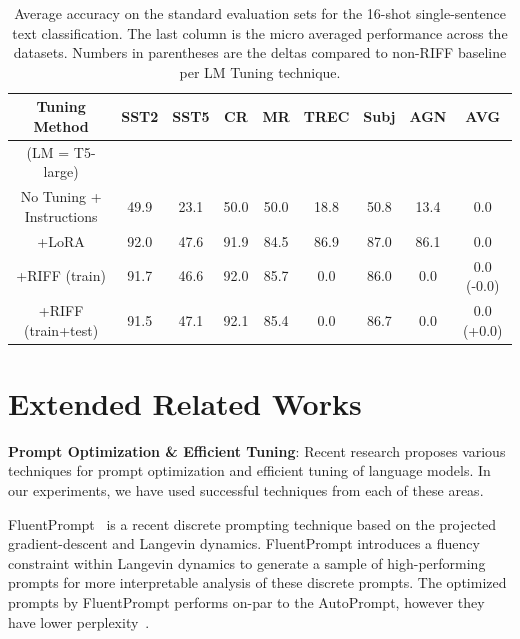 \documentclass[11pt]{article}
\begin{document}
\begin{table}
\centering
\caption{Average accuracy on the standard evaluation sets for the 16-shot single-sentence text classification. The last column is the micro averaged performance across the datasets. Numbers in parentheses are the deltas compared to non-RIFF baseline per LM Tuning technique.}

\begin{tabular}{c | c | c | c | c | c | c | c || c }
\hline
Tuning Method & SST2 & SST5 & CR & MR & TREC & Subj & AGN & AVG \\
\hline
\small (LM = T5-large) &  &  &  &  &  &  &  & \\
\small No Tuning + Instructions & \small49.9 & \small23.1 & \small50.0 & \small50.0 & \small18.8 & \small 50.8 & \small 13.4 & \small0.0 \\
    \small +LoRA & \small92.0 & \small47.6 & \small91.9 & \small84.5 & \small86.9 & \small87.0 & \small86.1 & \small0.0 \\
\tiny+RIFF (train) & \small91.7 & \small46.6 & \small92.0 & \small85.7 & \small0.0 & \small86.0 & \small 0.0 &\;\;\;\;\;\;\;\;\small0.0 (-0.0)\\
\tiny+RIFF (train+test) & \small91.5 & \small47.1 & \small92.1 & \small85.4 & \small0.0 & \small86.7 & \small 0.0 &\;\;\;\;\;\;\;\;\small0.0 (+0.0)\\
\hline
\end{tabular}
\label{RIFF-vs-lora-other-lms}
\end{table}

\section{Extended Related Works}
\label{related-works-extra:appendix}

\noindent
{\bf Prompt Optimization \& Efficient Tuning}: Recent research proposes various techniques for prompt optimization and efficient tuning of language models. In our experiments, we have used successful techniques from each of these areas.

FluentPrompt~\cite{shi2022human} is a recent discrete prompting technique based on the projected gradient-descent and Langevin dynamics. FluentPrompt introduces a fluency constraint within Langevin dynamics to generate a sample of high-performing prompts for more interpretable analysis of these discrete prompts. The optimized prompts by FluentPrompt performs on-par to the AutoPrompt, however they have lower perplexity~\cite{shi2022human}.
\end{document}
